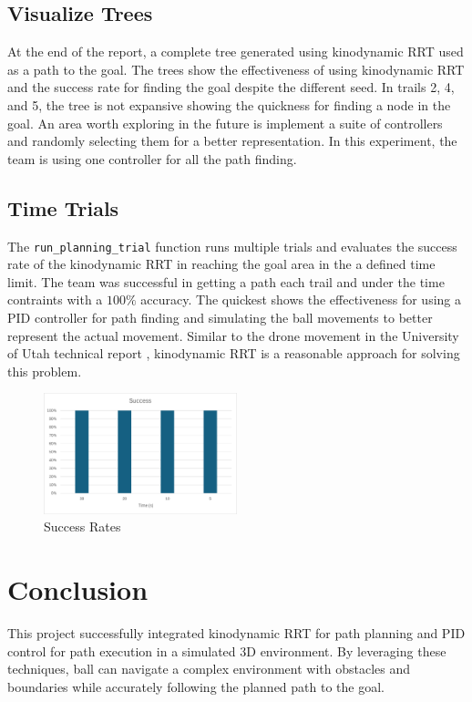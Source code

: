 \documentclass[12pt]{article}
\begin{document}
\subsection{Visualize Trees}

At the end of the report, a complete tree generated using kinodynamic RRT used as a path to the goal. The trees show the effectiveness of using kinodynamic RRT and the success rate for finding the goal despite the different seed. In trails 2, 4, and 5, the tree is not expansive showing the quickness for finding a node in the goal. An area worth exploring in the future is implement a suite of controllers and randomly selecting them for a better representation. In this experiment, the team is using one controller for all the path finding. 

\subsection{Time Trials}

The \texttt{run\_planning\_trial} function runs multiple trials and evaluates the success rate of the kinodynamic RRT in reaching the goal area in the a defined time limit. The team was successful in getting a path each trail and under the time contraints with a $100\%$ accuracy. The quickest shows the effectiveness for using a PID controller for path finding and simulating the ball movements to better represent the actual movement. Similar to the drone movement in the University of Utah technical report \cite{uucs_12_002}, kinodynamic RRT is a reasonable approach for solving this problem. 

\begin{figure}[h!]
    \centering
    \includegraphics[width=0.5\textwidth]{./images/success.png}
    \caption{Success Rates}
    \label{fig:Succees Rates}
\end{figure}

\section{Conclusion}
This project successfully integrated kinodynamic RRT for path planning and PID control for path execution in a simulated 3D environment. By leveraging these techniques, ball can navigate a complex environment with obstacles and boundaries while accurately following the planned path to the goal.
\end{document}
